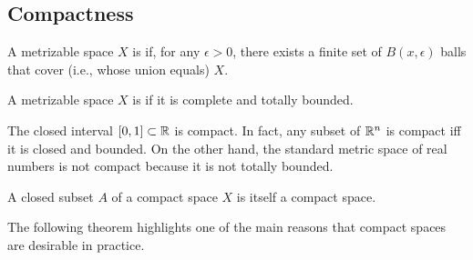 

\subsection{Compactness}

\begin{definition}
A metrizable space $X$ is  if, for any $\epsilon > 0$, there exists a finite set of $B(x,\epsilon)$ balls that cover (i.e., whose union equals) $X$.
\end{definition}

\begin{definition}
A metrizable space $X$ is  if it is complete and totally bounded.
\end{definition}

The closed interval $[0,1]\subset \mathbb{R}$ is compact.
In fact, any subset of $\mathbb{R}^n$ is compact iff it is closed and bounded.
On the other hand, the standard metric space of real numbers is not compact because it is not totally bounded.

\begin{theorem}
\label{thm:CompactClosedSubsetCompact}
A closed subset $A$ of a compact space $X$ is itself a compact space.
\end{theorem}

The following theorem highlights one of the main reasons that compact spaces are desirable in practice.

